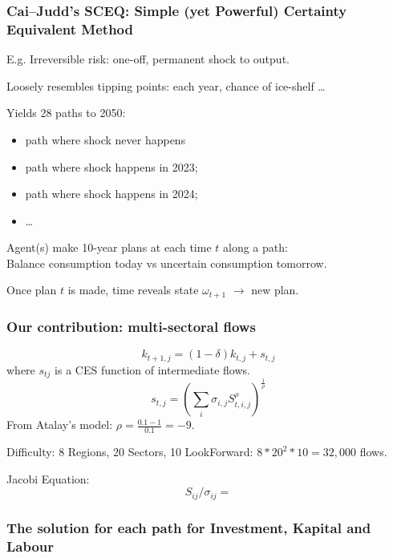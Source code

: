 \documentclass[handout,english]{beamer}
\begin{document}
\begin{frame}
  \frametitle{Cai--Judd's SCEQ: \small Simple (yet Powerful) Certainty Equivalent Method}
  E.g. Irreversible risk:  one-off, permanent shock to output.

  Loosely resembles tipping points: each year, chance of ice-shelf \dots

  Yields 28 paths to 2050:
    \begin{itemize}
    \item path where shock never happens
    \item path where shock happens in 2023;
    \item path where shock happens in 2024;
    \item \dots
    \end{itemize}
  Agent(s) make 10-year plans at each time $t$ along a path:\\
  
  Balance consumption today vs uncertain consumption tomorrow.

  Once plan $t$ is made, time reveals state $\omega_{t+1}$ $\rightarrow$ new plan.

\end{frame}

\begin{frame}
  \frametitle{Our contribution: multi-sectoral flows}
  \[
    k_{t + 1, j} = (1 - \delta) k_{t, j} + s_{t, j}
  \]
  where $s_{tj}$ is a CES function of intermediate flows.
  \[
    s_{t, j} = \left(\sum_{i} \sigma_{i, j} S_{t, i, j} ^ {\rho} \right)
      ^ {\frac{1}{\rho}}
  \]
  From Atalay's model: $\rho = \frac{0.1 - 1}{0.1} = -9$.

  Difficulty: 8 Regions, 20 Sectors, 10 LookForward: $8 * 20^2 * 10 = 32,000$ flows.

  Jacobi Equation:
    \[
      S_{ij} / \sigma_{ij} = 
    \]
\end{frame}
\begin{frame}
  \frametitle{The solution for each path for Investment, Kapital and Labour}
  

\end{frame}
\end{document}
